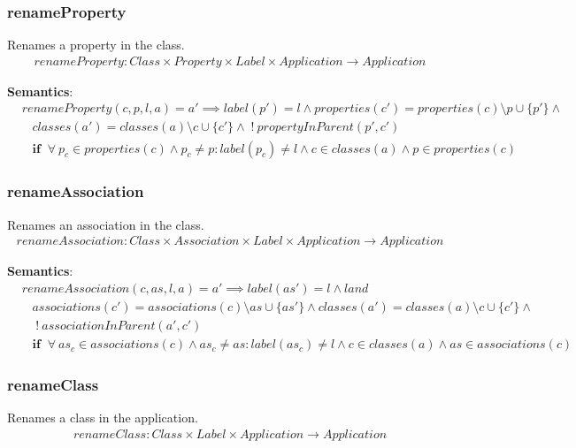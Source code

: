 \documentclass[10pt]{article}
\begin{document}
\subsubsection{renameProperty}
Renames a property in the class.
\begin{align}
renameProperty: Class \times Property \times Label \times Application \rightarrow Application
\end{align}

\noindent \textbf{Semantics}:
\begin{align}
& renameProperty(c, p, l, a) = a' \implies  label(p') = l  \land properties(c') = properties(c) \setminus p \cup \{ p' \} \land \nonumber \\
& \;\;\; classes(a') = classes(a) \setminus c  \cup \{c'\} \land \; ! \: propertyInParent(p', c') \nonumber \\
& \;\;\; \mathbf{if} \;\; \forall \: p_c \in properties(c) \land p_c \neq p : label(p_c) \neq l \land c \in classes(a) \land p \in properties(c)
\end{align}

\subsubsection{renameAssociation}
Renames an association in the class.
\begin{align}
renameAssociation: Class \times Association \times Label \times Application \rightarrow Application
\end{align}

\noindent \textbf{Semantics}:
\begin{align}
& renameAssociation(c, as, l, a) = a' \implies  label(as') = l  \land land \nonumber \\
& \;\;\; associations(c') = associations(c) \setminus as \cup \{ as' \} \land classes(a') = classes(a) \setminus c  \cup \{c'\} \land \nonumber \\
& \;\;\; \; ! \: associationInParent(a', c') \nonumber \\
& \;\;\; \mathbf{if} \;\; \forall \: as_c \in associations(c) \land as_c \neq as : label(as_c) \neq l \land c \in classes(a) \land as \in associations(c)
\end{align}

\subsubsection{renameClass}
Renames a class in the application.
\begin{align}
renameClass: Class \times Label \times Application \rightarrow Application
\end{align}
\end{document}
